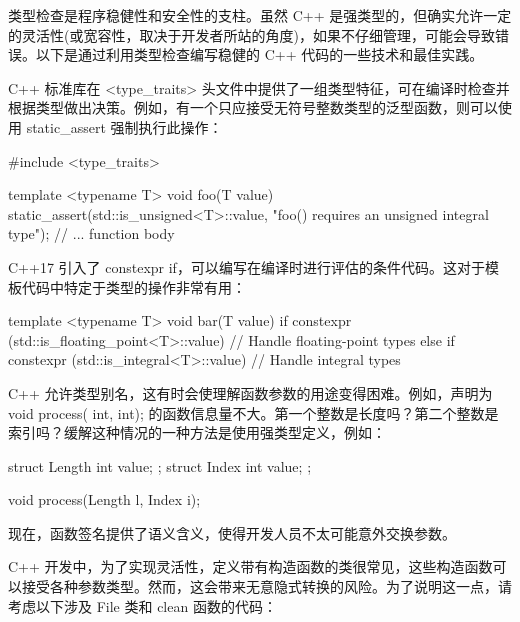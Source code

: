 


类型检查是程序稳健性和安全性的支柱。虽然 C++ 是强类型的，但确实允许一定的灵活性(或宽容性，取决于开发者所站的角度)，如果不仔细管理，可能会导致错误。以下是通过利用类型检查编写稳健的 C++ 代码的一些技术和最佳实践。


C++ 标准库在 <type\_traits> 头文件中提供了一组类型特征，可在编译时检查并根据类型做出决策。例如，有一个只应接受无符号整数类型的泛型函数，则可以使用 static\_assert 强制执行此操作：

\begin{cpp}
#include <type_traits>

template <typename T>
void foo(T value) {
    static_assert(std::is_unsigned<T>::value, "foo() requires an unsigned integral type");
    // ... function body
}
\end{cpp}


C++17 引入了 constexpr if，可以编写在编译时进行评估的条件代码。这对于模板代码中特定于类型的操作非常有用：

\begin{cpp}
template <typename T>
void bar(T value) {
    if constexpr (std::is_floating_point<T>::value) {
        // Handle floating-point types
    } else if constexpr (std::is_integral<T>::value) {
        // Handle integral types
    }
}
\end{cpp}


C++ 允许类型别名，这有时会使理解函数参数的用途变得困难。例如，声明为 void process( int, int); 的函数信息量不大。第一个整数是长度吗？第二个整数是索引吗？缓解这种情况的一种方法是使用强类型定义，例如：

\begin{cpp}
struct Length { int value; };
struct Index { int value; };

void process(Length l, Index i);
\end{cpp}

现在，函数签名提供了语义含义，使得开发人员不太可能意外交换参数。



C++ 开发中，为了实现灵活性，定义带有构造函数的类很常见，这些构造函数可以接受各种参数类型。然而，这会带来无意隐式转换的风险。为了说明这一点，请考虑以下涉及 File 类和 clean 函数的代码：

